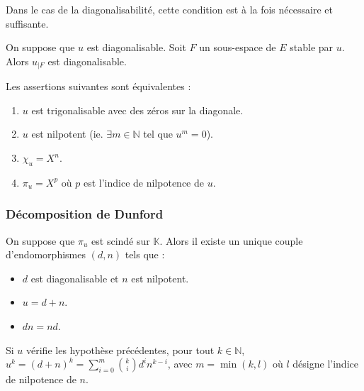   \begin{remark}
    Dans le cas de la diagonalisabilité, cette condition est à la fois nécessaire et suffisante.
  \end{remark}


  \begin{proposition}
    On suppose que $u$ est diagonalisable. Soit $F$ un sous-espace de $E$ stable par $u$. Alors $u_{|F}$ est diagonalisable.
  \end{proposition}


  \begin{application}
    Les assertions suivantes sont équivalentes :
    \begin{enumerate}[label={\bfseries(\roman*)}]
      \item $u$ est trigonalisable avec des zéros sur la diagonale.
      \item $u$ est nilpotent (ie. $\exists m \in \mathbb{N}$ tel que $u^m = 0$).
      \item $\chi_u = X^n$.
      \item $\pi_u = X^p$ où $p$ est l'indice de nilpotence de $u$.
    \end{enumerate}
  \end{application}

  \subsubsection{Décomposition de Dunford}


  \begin{theorem}
    On suppose que $\pi_u$ est scindé sur $\mathbb{K}$. Alors il existe un unique couple d'endomorphismes $(d, n)$ tels que :
    \begin{itemize}
      \item $d$ est diagonalisable et $n$ est nilpotent.
      \item $u = d + n$.
      \item $d n = n d$.
    \end{itemize}
  \end{theorem}

  \begin{corollary}
    Si $u$ vérifie les hypothèse précédentes, pour tout $k \in \mathbb{N}$, $u^k = (d + n)^k = \sum_{i=0}^m \binom{k}{i} d^i n^{k-i}$, avec $m = \min(k, l)$ où $l$ désigne l'indice de nilpotence de $n$.
  \end{corollary}

